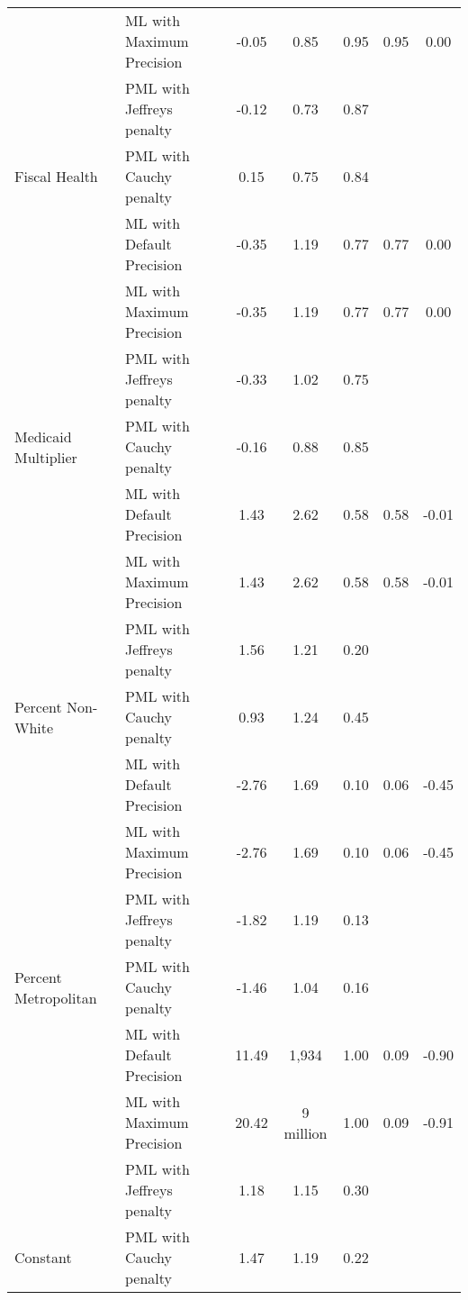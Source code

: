 \begin{tabular}{llccccc}
 & ML with Maximum Precision & -0.05 & 0.85 & 0.95 & 0.95 & 0.00\\

 & PML with Jeffreys penalty & -0.12 & 0.73 & 0.87 &  & \\

\multirow{-4}{*}{\raggedright\arraybackslash Fiscal Health} & PML with Cauchy penalty & 0.15 & 0.75 & 0.84 &  & \\
\cmidrule{1-7}
 & ML with Default Precision & -0.35 & 1.19 & 0.77 & 0.77 & 0.00\\

 & ML with Maximum Precision & -0.35 & 1.19 & 0.77 & 0.77 & 0.00\\

 & PML with Jeffreys penalty & -0.33 & 1.02 & 0.75 &  & \\

\multirow{-4}{*}{\raggedright\arraybackslash Medicaid Multiplier} & PML with Cauchy penalty & -0.16 & 0.88 & 0.85 &  & \\
\cmidrule{1-7}
 & ML with Default Precision & 1.43 & 2.62 & 0.58 & 0.58 & -0.01\\

 & ML with Maximum Precision & 1.43 & 2.62 & 0.58 & 0.58 & -0.01\\

 & PML with Jeffreys penalty & 1.56 & 1.21 & 0.20 &  & \\

\multirow{-4}{*}{\raggedright\arraybackslash Percent Non-White} & PML with Cauchy penalty & 0.93 & 1.24 & 0.45 &  & \\
\cmidrule{1-7}
 & ML with Default Precision & -2.76 & 1.69 & 0.10 & 0.06 & -0.45\\

 & ML with Maximum Precision & -2.76 & 1.69 & 0.10 & 0.06 & -0.45\\

 & PML with Jeffreys penalty & -1.82 & 1.19 & 0.13 &  & \\

\multirow{-4}{*}{\raggedright\arraybackslash Percent Metropolitan} & PML with Cauchy penalty & -1.46 & 1.04 & 0.16 &  & \\
\cmidrule{1-7}
 & ML with Default Precision & 11.49 & 1,934 & 1.00 & 0.09 & -0.90\\

 & ML with Maximum Precision & 20.42 & 9 million & 1.00 & 0.09 & -0.91\\

 & PML with Jeffreys penalty & 1.18 & 1.15 & 0.30 &  & \\

\multirow{-4}{*}{\raggedright\arraybackslash Constant} & PML with Cauchy penalty & 1.47 & 1.19 & 0.22 &  & \\
\bottomrule
\end{tabular}